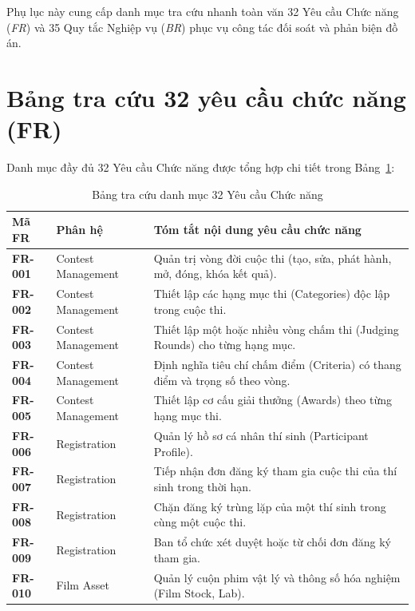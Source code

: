 
Phụ lục này cung cấp danh mục tra cứu nhanh toàn văn 32 Yêu cầu Chức năng (\textit{FR}) và 35 Quy tắc Nghiệp vụ (\textit{BR}) phục vụ công tác đối soát và phản biện đồ án.

\section{Bảng tra cứu 32 yêu cầu chức năng (FR)}
\label{a:fr_catalog}

Danh mục đầy đủ 32 Yêu cầu Chức năng được tổng hợp chi tiết trong Bảng~\ref{tab:a_fr_catalog}:

\begin{table}[!ht]
\centering
\caption{Bảng tra cứu danh mục 32 Yêu cầu Chức năng}
\label{tab:a_fr_catalog}
\scriptsize
\begin{tabularx}{\textwidth}{p{1.8cm}p{3.2cm}>{\raggedright\arraybackslash}X}
\toprule
\textbf{Mã FR} & \textbf{Phân hệ} & \textbf{Tóm tắt nội dung yêu cầu chức năng} \\
\midrule
\textbf{FR-001} & Contest Management & Quản trị vòng đời cuộc thi (tạo, sửa, phát hành, mở, đóng, khóa kết quả). \\
\textbf{FR-002} & Contest Management & Thiết lập các hạng mục thi (Categories) độc lập trong cuộc thi. \\
\textbf{FR-003} & Contest Management & Thiết lập một hoặc nhiều vòng chấm thi (Judging Rounds) cho từng hạng mục. \\
\textbf{FR-004} & Contest Management & Định nghĩa tiêu chí chấm điểm (Criteria) có thang điểm và trọng số theo vòng. \\
\textbf{FR-005} & Contest Management & Thiết lập cơ cấu giải thưởng (Awards) theo từng hạng mục thi. \\
\textbf{FR-006} & Registration & Quản lý hồ sơ cá nhân thí sinh (Participant Profile). \\
\textbf{FR-007} & Registration & Tiếp nhận đơn đăng ký tham gia cuộc thi của thí sinh trong thời hạn. \\
\textbf{FR-008} & Registration & Chặn đăng ký trùng lặp của một thí sinh trong cùng một cuộc thi. \\
\textbf{FR-009} & Registration & Ban tổ chức xét duyệt hoặc từ chối đơn đăng ký tham gia. \\
\textbf{FR-010} & Film Asset & Quản lý cuộn phim vật lý và thông số hóa nghiệm (Film Stock, Lab). \\

\end{tabularx}
\end{table}
